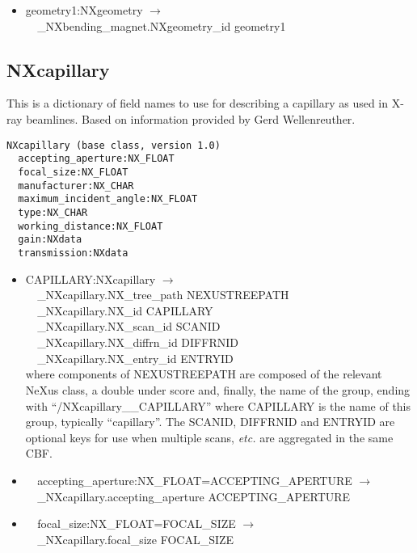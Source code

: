 \documentclass[11pt]{article}
\begin{document}
{{\begin{itemize}
\item{geometry1:NXgeometry $\rightarrow$\\
\verb|  |\_NXbending\_magnet.NXgeometry\_id geometry1}
\end{itemize}
\subsection{NXcapillary}

This is a dictionary of field names to use for describing a capillary as used in X-ray beamlines. Based on information provided by Gerd Wellenreuther.

\begin{verbatim}
NXcapillary (base class, version 1.0)
  accepting_aperture:NX_FLOAT
  focal_size:NX_FLOAT
  manufacturer:NX_CHAR
  maximum_incident_angle:NX_FLOAT
  type:NX_CHAR
  working_distance:NX_FLOAT
  gain:NXdata
  transmission:NXdata
\end{verbatim}

\begin{itemize}

\item{CAPILLARY:NXcapillary $\rightarrow$\\
\verb|  |\_NXcapillary.NX\_tree\_path    NEXUSTREEPATH \\
\verb|  |\_NXcapillary.NX\_id            CAPILLARY\\
\verb|  |\_NXcapillary.NX\_scan\_id      SCANID \\
\verb|  |\_NXcapillary.NX\_diffrn\_id    DIFFRNID \\
\verb|  |\_NXcapillary.NX\_entry\_id     ENTRYID \\
where components of NEXUSTREEPATH are composed of the
relevant NeXus class, a double under score and, finally, the
name of the group, ending with ``/NXcapillary\_\_CAPILLARY''
where CAPILLARY is the name of this group, typically ``capillary''.
The SCANID, DIFFRNID and ENTRYID are optional keys for use
when multiple scans, {\it etc.} are aggregated in the same CBF.}

\item{\verb|  |accepting\_aperture:NX\_FLOAT=ACCEPTING\_APERTURE $\rightarrow$\\
\verb|  |\_NXcapillary.accepting\_aperture ACCEPTING\_APERTURE}

\item{\verb|  |focal\_size:NX\_FLOAT=FOCAL\_SIZE $\rightarrow$\\
\verb|  |\_NXcapillary.focal\_size FOCAL\_SIZE}


\end{itemize}}}
\end{document}
